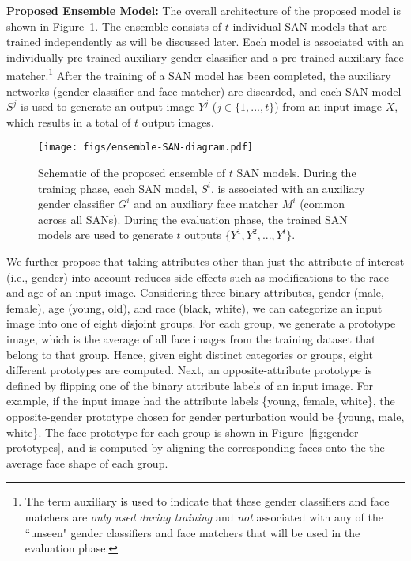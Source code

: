 \documentclass[10pt,twocolumn,letterpaper]{article}
\begin{document}
{\bf Proposed Ensemble Model:}  The overall architecture of the proposed model is shown in Figure~\ref{fig:ensan-diagram}. The ensemble consists of $t$ individual SAN models that are trained independently as will be discussed later. Each model is associated with an individually pre-trained auxiliary gender classifier and a pre-trained auxiliary face matcher.\footnote{The term auxiliary is used to indicate that these gender classifiers and face matchers are {\em only used during training} and {\em not} associated with any of the ``unseen" gender classifiers and face matchers that will be used in the evaluation phase.}  After the training of a SAN model has been completed, the auxiliary networks (gender classifier and face matcher) are discarded, and each SAN model $S^j$ is used to generate an output image $Y^j$ ($j \in \{1, ..., t\}$) from an input image $X$, which results in a total of $t$ output images.

\begin{figure}[t!]
\begin{center}
   \texttt{[image: figs/ensemble-SAN-diagram.pdf]}
\end{center}
   \caption{Schematic of the proposed ensemble of $t$ SAN models. During the training phase, each SAN model, $S^i$, is associated with an auxiliary gender classifier $G^i$ and an auxiliary face matcher $M^i$ (common across all SANs). During the evaluation phase, the trained SAN models are used to generate $t$ outputs $\{Y^1, Y^2, ..., Y^t\}$.}
\label{fig:ensan-diagram}
\end{figure}

We further propose that taking attributes other than just the attribute of interest (i.e., gender) into account reduces side-effects such as modifications to the race and age of an input image. Considering three binary attributes, gender (male, female), age (young, old), and race (black, white), we can categorize an input image into one of eight disjoint groups. For each group, we generate a prototype image, which is the average of all face images from the training dataset that belong to that group. Hence, given eight distinct categories or groups, eight different prototypes are computed. Next, an opposite-attribute prototype is defined by flipping one of the binary attribute labels of an input image. For example, if the input image had the attribute labels \{young, female, white\}, the opposite-gender prototype chosen for gender perturbation would be \{young, male, white\}. The face prototype for each group is shown in Figure~\ref{fig:gender-prototypes}, and is computed by aligning the corresponding faces onto the the average face shape of each group.
\end{document}
